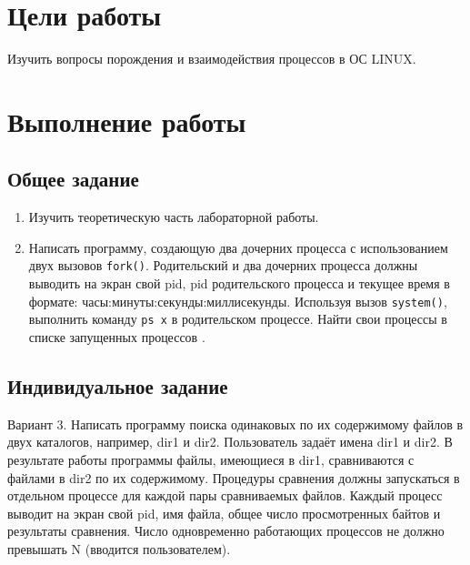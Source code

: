 \section{Цели работы}
\label{sec:target}

Изучить вопросы порождения и взаимодействия процессов в ОС LINUX.

\section{Выполнение работы}
\label{sec:job} 
\subsection{Общее задание}
\label{sec:job:general_task}

\begin{enumerate}[listparindent=\fivecharsapprox]
	\item Изучить теоретическую часть лабораторной работы.
	\item Написать программу, создающую два дочерних процесса с использованием двух вызовов \lstinline{fork()}.
Родительский и два дочерних процесса должны выводить на экран свой pid, pid родительского процесса и текущее время в формате: часы:минуты:секунды:миллисекунды. Используя вызов \lstinline{system()}, выполнить команду \lstinline{ps x} в родительском процессе.
Найти свои процессы в списке запущенных процессов .



\end{enumerate}

\subsection{Индивидуальное задание}
\label{sec:job:personal_task}

Вариант 3. Написать программу поиска одинаковых по их содержимому файлов в двух каталогов, например, dir1 и dir2.
Пользователь задаёт имена dir1 и dir2.
В результате работы программы файлы, имеющиеся в dir1, сравниваются с файлами в dir2 по их содержимому.
Процедуры сравнения должны запускаться в отдельном процессе для каждой пары сравниваемых файлов.
Каждый процесс выводит на экран свой pid, имя файла, общее число просмотренных байтов и результаты сравнения.
Число одновременно работающих процессов не должно превышать N (вводится пользователем).


